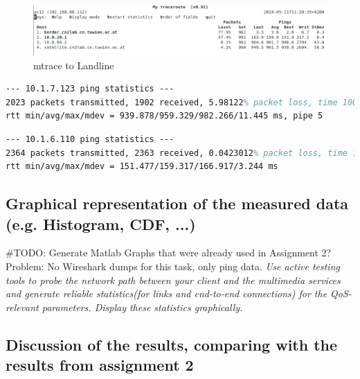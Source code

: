 \documentclass[parskip=full]{scrartcl}
\begin{document}
\begin{figure}[ht]
    \centering
   \includegraphics[width=\textwidth]{images/mytraceroute2.png} 
    \caption{mtrace to Landline}
    \label{fig:mtraceLandline}
\end{figure}


\begin{lstlisting}[language=tex, breaklines, frame=single, caption={Landline Network Parameters}, label=lst:landlineNetwork, float, floatplacement=h]
--- 10.1.7.123 ping statistics ---
2023 packets transmitted, 1902 received, 5.98122% packet loss, time 1004ms
rtt min/avg/max/mdev = 939.878/959.329/982.266/11.445 ms, pipe 5
\end{lstlisting}

\begin{lstlisting}[language=tex, breaklines, frame=single, caption={Landline Network Parameters}, label=lst:landlineNetwork, float, floatplacement=h]
--- 10.1.6.110 ping statistics ---
2364 packets transmitted, 2363 received, 0.0423012% packet loss, time 1105ms
rtt min/avg/max/mdev = 151.477/159.317/166.917/3.244 ms
\end{lstlisting}


\subsection{Graphical representation of the measured data (e.g. Histogram, CDF, ...)}

\#TODO: Generate Matlab Graphs that were already used in Assignment 2?
Problem: No Wireshark dumps for this task, only ping data. 
\textit{Use active testing tools to probe the network path between your client and the multimedia services and generate reliable statistics(for links and end-to-end connections) for the QoS-relevant parameters. Display these statistics graphically.}
\subsection{Discussion of the results, comparing with the results from assignment 2}
\end{document}
